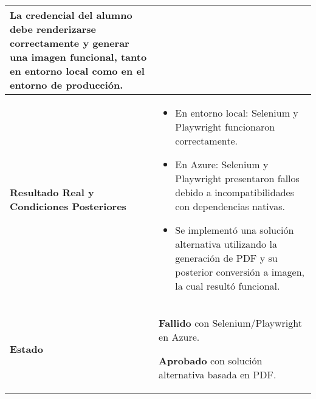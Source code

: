 \begin{longtable}{|p{5cm}|p{10cm}|}
	La credencial del alumno debe renderizarse correctamente y generar una imagen funcional, tanto en entorno local como en el entorno de producción. \\
	\hline
	\textbf{Resultado Real y Condiciones Posteriores} & 
	\begin{itemize}
		\item En entorno local: Selenium y Playwright funcionaron correctamente.
		\item En Azure: Selenium y Playwright presentaron fallos debido a incompatibilidades con dependencias nativas.
		\item Se implementó una solución alternativa utilizando la generación de PDF y su posterior conversión a imagen, la cual resultó funcional.
	\end{itemize} \\
	\hline
	\textbf{Estado} & 
	\textbf{Fallido} con Selenium/Playwright en Azure.  
	
	\textbf{Aprobado} con solución alternativa basada en PDF. \\
	\hline
\end{longtable}